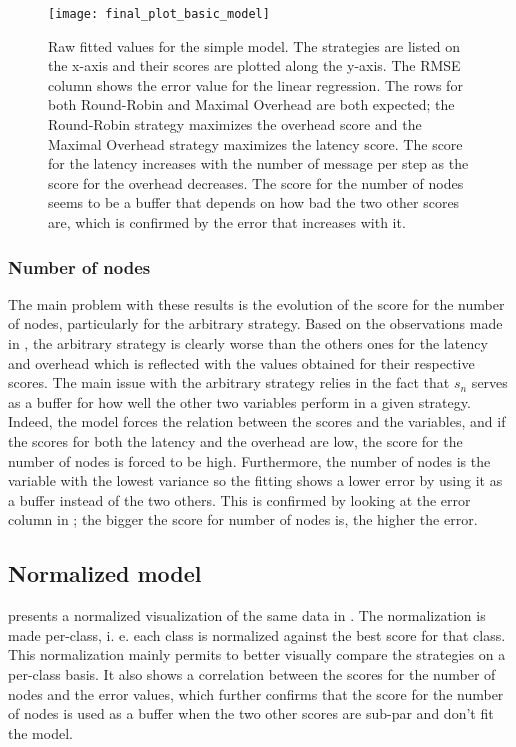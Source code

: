 \begin{figure}[h]
    \centering
    \texttt{[image: final\_plot\_basic\_model]}
    \caption{Raw fitted values for the simple model. The strategies are listed
    on the x-axis and their scores are plotted along the y-axis. The RMSE column shows the error value for the linear
        regression. The rows for both Round-Robin and Maximal Overhead are both
        expected; the Round-Robin strategy maximizes the overhead score and the
        Maximal Overhead strategy maximizes the latency score. The score for the
        latency increases with the number of message per step as the score for
        the overhead decreases. The score for the number of nodes seems to be a
        buffer that depends on how bad the two other scores are, which is
        confirmed by the error that increases with it.
    }
    \label{fig:recapTestsPlot}
\end{figure}

\subsubsection{Number of nodes}
\label{ssec:nbNodes}
The main problem with these results is the evolution of the score for the number
of nodes, particularly for the arbitrary strategy. Based on the observations
made in , the arbitrary strategy is clearly worse than the
others ones for the latency and overhead which is reflected with the values
obtained for their respective scores. The main issue with the arbitrary strategy
relies in the fact that \(s_n\) serves as a buffer for how well the other two
variables perform in a given strategy.  Indeed, the model forces the relation
between the scores and the variables, and if the scores for both the latency and
the overhead are low, the score for the number of nodes is forced to be high.
Furthermore, the number of nodes is the variable with the lowest variance so the
fitting shows a lower error by using it as a buffer instead of the two others.
This is confirmed by looking at the error column in ; the
bigger the score for number of nodes is, the higher the error. 

\FloatBarrier
\subsection{Normalized model}
 presents a normalized visualization of the same
data in . The normalization is made per-class, i. e.
each class is normalized against the best score for that class. This
normalization mainly permits to better visually compare the strategies on a
per-class basis. It also shows a correlation between the scores for the number
of nodes and the error values, which further confirms that the score for the
number of nodes is used as a buffer when the two other scores are sub-par and
don't fit the model.


